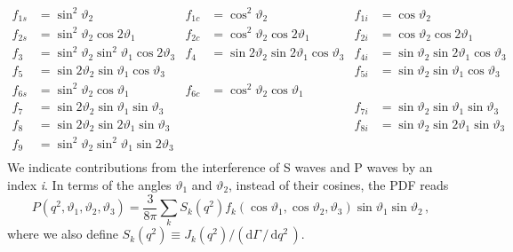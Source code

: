 \documentclass[aps,prd,reprint,nofootinbib,preprintnumbers]{revtex4}
\newcommand{\rmdx}[1]{\mbox{d} #1 \,} %
\renewcommand{\theta}{\vartheta}
\begin{document}
\begin{equation}
\begin{aligned}
    f_{1s} & = \sin^2\theta_2 &
    f_{1c} & = \cos^2\theta_2 &
    f_{1i} & = \cos\theta_2\\
    f_{2s} & = \sin^2\theta_2 \cos 2\theta_1 &
    f_{2c} & = \cos^2\theta_2 \cos 2\theta_1 &
    f_{2i} & = \cos\theta_2 \cos 2\theta_1\\
    f_{3}  & = \sin^2\theta_2\sin^2\theta_1 \cos 2\theta_3 &
    f_{4}  & = \sin 2\theta_2 \sin 2\theta_1 \cos\theta_3 &
    f_{4i} & = \sin\theta_2 \sin 2\theta_1 \cos\theta_3\\
    f_{5}  & = \sin 2\theta_2 \sin \theta_1 \cos\theta_3 & & &
    f_{5i} & = \sin\theta_2 \sin \theta_1 \cos\theta_3\\
    f_{6s} & = \sin^2\theta_2 \cos\theta_1 &
    f_{6c} & = \cos^2\theta_2 \cos\theta_1\\
    f_{7}  & = \sin 2\theta_2 \sin \theta_1 \sin\theta_3 & & &
    f_{7i} & = \sin\theta_2 \sin \theta_1 \sin\theta_3\\
    f_{8}  & = \sin 2\theta_2 \sin 2\theta_1 \sin\theta_3 & & &
    f_{8i} & = \sin\theta_2 \sin 2\theta_1 \sin\theta_3\\
    f_{9}  & = \sin^2\theta_2\sin^2\theta_1 \sin 2\theta_3\\
\end{aligned}
\end{equation}
We indicate contributions from the interference of S waves and P waves by an index \emph{i}. In terms of the angles $\theta_1$ and $\theta_2$, instead of their cosines, the PDF reads
\begin{equation}
    P(q^2, \theta_1, \theta_2, \theta_3) = \frac{3}{8\pi} \sum_k S_k(q^2) f_k(\cos\theta_1, \cos\theta_2, \theta_3) \sin\theta_1 \sin\theta_2\,,
\end{equation}
where we also define $S_k(q^2) \equiv J_k(q^2) / (\rmdx{\Gamma} /\, \rmdx{q^2})$.\\
\end{document}
